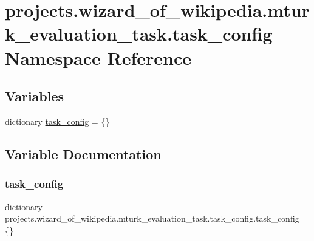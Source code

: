 \hypertarget{namespaceprojects_1_1wizard__of__wikipedia_1_1mturk__evaluation__task_1_1task__config}{}\section{projects.\+wizard\+\_\+of\+\_\+wikipedia.\+mturk\+\_\+evaluation\+\_\+task.\+task\+\_\+config Namespace Reference}
\label{namespaceprojects_1_1wizard__of__wikipedia_1_1mturk__evaluation__task_1_1task__config}
\subsection*{Variables}
\begin{DoxyCompactItemize}
\item 
dictionary \hyperlink{namespaceprojects_1_1wizard__of__wikipedia_1_1mturk__evaluation__task_1_1task__config_a60b517e1fd36d343ba0c8672ede678eb}{task\+\_\+config} = \{\}
\end{DoxyCompactItemize}


\subsection{Variable Documentation}
\mbox{\label{namespaceprojects_1_1wizard__of__wikipedia_1_1mturk__evaluation__task_1_1task__config_a60b517e1fd36d343ba0c8672ede678eb}} 
\subsubsection{\texorpdfstring{task\+\_\+config}{task\_config}}
{\footnotesize\ttfamily dictionary projects.\+wizard\+\_\+of\+\_\+wikipedia.\+mturk\+\_\+evaluation\+\_\+task.\+task\+\_\+config.\+task\+\_\+config = \{\}}

